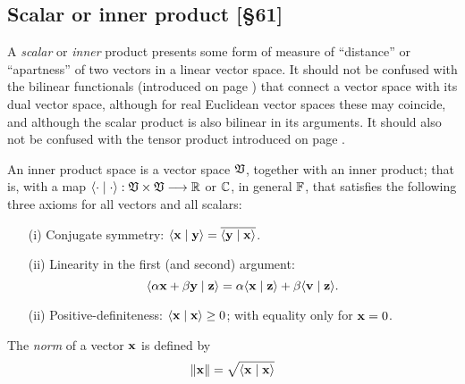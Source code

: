 \subsection{Scalar or inner product
[\S61]}
\label{2011-m-scalarproduct}

A {\em scalar} or {\em inner} product presents some form of measure of ``distance'' or ``apartness''
of two vectors in a linear vector space.
It should not be confused with the bilinear functionals (introduced on page \pageref{2011-m-dvs}) that connect a vector space with its dual vector space,
although for real Euclidean vector spaces these may coincide,
and although the scalar product is also bilinear in its arguments.
It should also not be confused with the tensor product introduced on page \pageref{2011-m-tensorp}.

An inner product space is a vector space $\frak V$,
together with an inner product; that is, with a map
 $\langle \cdot \mid \cdot \rangle :  \frak V  \times  \frak V  \longrightarrow {\Bbb R}$
or ${\Bbb C}$, in general ${\Bbb F}$,
that satisfies the following three axioms for all vectors  and all scalars:

\begin{itemize}
\item[(i)]
Conjugate symmetry:
$
\langle {\bf x}\mid {\bf y}\rangle
=
\overline{\langle {\bf y}\mid {\bf x}\rangle }$.
\item[(ii)]
Linearity in the first (and second) argument:
$$
\langle \alpha {\bf x} +\beta {\bf y}\mid {\bf z}\rangle
=
\alpha {\langle {\bf x}\mid {\bf z}\rangle}
+\beta {\langle {\bf v}\mid {\bf z}\rangle}
.
$$

\item[(ii)]
Positive-definiteness:
$
\langle {\bf x}\mid {\bf x}\rangle
\ge
0$;  with equality only for ${\bf x} = 0$.
\end{itemize}

The {\em norm} of a vector ${\bf x}$
is defined by
\begin{equation}
\|
{\bf x}
\|
=\sqrt{\langle {\bf x}\mid {\bf x}\rangle }
\end{equation}


